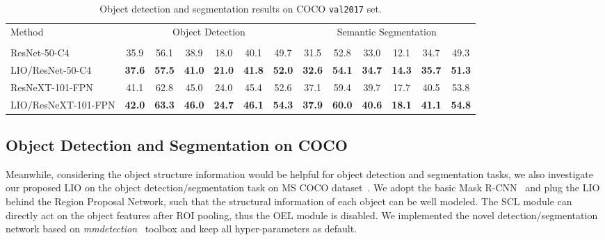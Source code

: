 \documentclass[10pt,twocolumn,letterpaper]{article}
\begin{document}
\begin{table*}[!h]
\small
\begin{center}
    \begin{tabular}{|l|cccccc|cccccc|}
    \hline
    \multirow{2}{*}{Method} & \multicolumn{6}{c|}{Object Detection} & \multicolumn{6}{c|}{Semantic Segmentation} \\ \cline{2-13}
    &  &  &  &  &  &  
    &  &  &  &  &  &  \\
    \hline\hline
    ResNet-50-C4 & 35.9 & 56.1 & 38.9 & 18.0 & 40.1 & 49.7
                 & 31.5 & 52.8 & 33.0 & 12.1 & 34.7 & 49.3 \\
    LIO/ResNet-50-C4  & \textbf{37.6} & \textbf{57.5} & \textbf{41.0} 
                      & \textbf{21.0} & \textbf{41.8} & \textbf{52.0}
                      & \textbf{32.6} & \textbf{54.1} & \textbf{34.7} 
                      & \textbf{14.3} & \textbf{35.7} & \textbf{51.3} \\
    \hline\hline
    ResNeXT-101-FPN & 41.1 & 62.8 & 45.0 & 24.0 & 45.4 & 52.6 
                    & 37.1 & 59.4 & 39.7 & 17.7 & 40.5 & 53.8 \\
    LIO/ResNeXT-101-FPN & \textbf{42.0} & \textbf{63.3} & \textbf{46.0} 
                           & \textbf{24.7} & \textbf{46.1} & \textbf{54.3} 
                           & \textbf{37.9} & \textbf{60.0} & \textbf{40.6} 
                           & \textbf{18.1} & \textbf{41.1} & \textbf{54.8} \\
    \hline
\end{tabular}

\end{center}
\caption{Object detection and segmentation results on COCO {\tt val2017} set.}
\label{tab:exp-detection}
\end{table*}

\subsection{Object Detection and Segmentation on COCO}\label{sec:det_seg}

Meanwhile, considering the object structure information would be helpful for object detection and segmentation tasks, we also investigate our proposed LIO on the object detection/segmentation task on MS COCO dataset~\cite{lin2014microsoft}. 
We adopt the basic Mask R-CNN~\cite{he2017mask} and plug the LIO behind the Region Proposal Network, such that the structural information of each object can be well modeled. The SCL module can directly act on the object features after ROI pooling, thus the OEL module is disabled. We implemented the novel detection/segmentation network based on \textit{mmdetection}~\cite{chen2019mmdetection} toolbox and keep all hyper-parameters as default.
\end{document}

